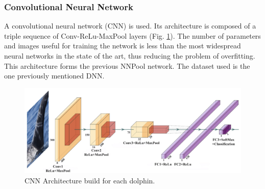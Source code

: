 \subsubsection{Convolutional Neural Network}
A convolutional neural network (CNN) is used. Its architecture is composed 
of a triple sequence of Conv-ReLu-MaxPool layers (Fig. \ref{fig:CNNDol}). The number of 
parameters and images useful for training the network is less than the most 
widespread neural networks in the state of the art, thus reducing the problem 
of overfitting. This architecture forms the previous NNPool network. The 
dataset used is the one previously mentioned DNN.
\begin{figure}[h!]
    \centering
    \includegraphics[width = 0.7\linewidth]{images/paper10/NNPool Architecture.png}
    \centering
    \caption{CNN Architecture build for each dolphin.}
    \label{fig:CNNDol}
\end{figure}

